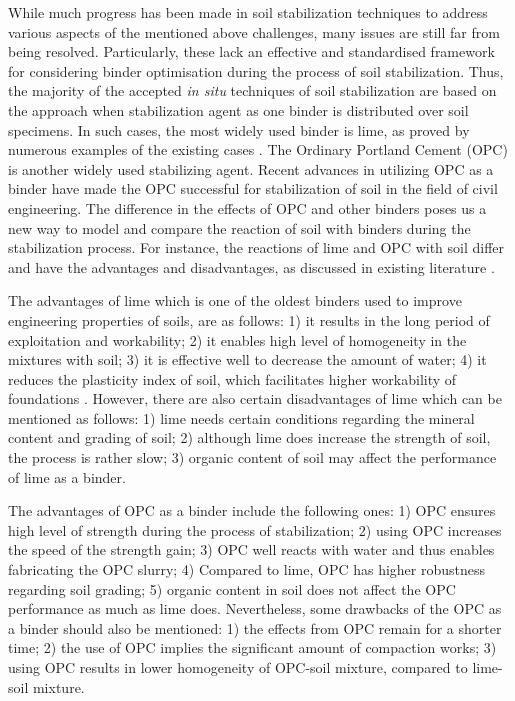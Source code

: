 \documentclass[eprint,
]{actapoly}
\begin{document}
While much progress has been made in soil stabilization techniques to address various aspects of the mentioned above challenges, many issues are still far from being resolved. Particularly, these lack an effective and standardised framework for considering binder optimisation during the process of soil stabilization. Thus, the majority of the accepted \emph{in situ} techniques of soil stabilization are based on the approach when stabilization agent as one binder is distributed over soil specimens. In such cases, the most widely used binder is lime, as proved by numerous examples of the existing cases \citep{Greaves,RaoThyagaraj,Rogersetal2000,ATTOHOKINE1995283,ROBIN2014211,Harichane,GlendinningRogers}. The Ordinary Portland Cement (OPC) is another widely used stabilizing agent. Recent advances in utilizing OPC as a binder \citep{Prusinski,Bhattacharjaetal2003,Lindh202201,Lindh202102,KULKARNI2022125363} have made the OPC successful for stabilization of soil in the field of civil engineering. The difference in the effects of OPC and other binders poses us a new way to model and compare the reaction of soil with binders during the stabilization process. For instance, the reactions of lime and OPC with soil differ and have the advantages and disadvantages, as discussed in existing literature \citep{Mahedi,KOLIAS2005301,BARMAN20221319,Lindhetal2000,Chewetal2004,KOOHMISHI2022100726}. 

The advantages of lime which is one of the oldest binders used to improve engineering properties of soils, are as follows: 1) it results in the long period of exploitation and workability; 2) it enables high level of homogeneity in the mixtures with soil; 3) it is effective well to decrease the amount of water; 4) it reduces the plasticity index of soil, which facilitates higher workability of foundations \cite{LindhLemenkovaCEE}. However, there are also certain disadvantages of lime which can be mentioned as follows: 1) lime needs certain conditions regarding the mineral content and grading of soil; 2) although lime does increase the strength of soil, the process is rather slow; 3) organic content of soil may affect the performance of lime as a binder.

The advantages of OPC as a binder include the following ones: 1) OPC ensures high level of strength during the process of stabilization; 2) using OPC increases the speed of the strength gain; 3) OPC well reacts with water and thus enables fabricating the OPC slurry; 4) Compared to lime, OPC has higher robustness regarding soil grading; 5) organic content in soil does not affect the OPC performance as much as lime does. Nevertheless, some drawbacks of the OPC as a binder should also be mentioned: 1) the effects from OPC remain for a shorter time; 2) the use of OPC implies the significant amount of compaction works; 3) using OPC results in lower homogeneity of OPC-soil mixture, compared to lime-soil mixture.
\end{document}
